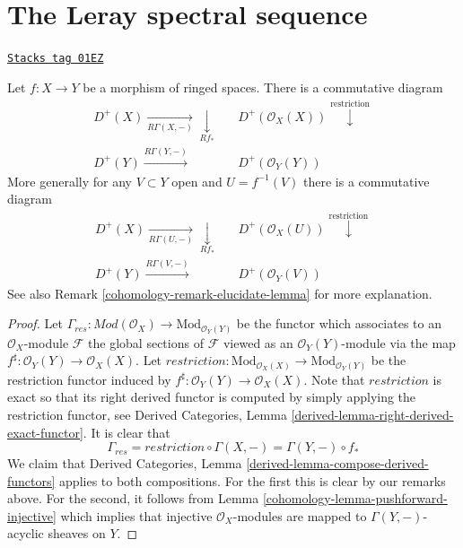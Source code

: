 \section{The Leray spectral sequence}
\label{cohomology-section-Leray}
\begin{lemma}
\label{cohomology-lemma-before-Leray}
\href{https://stacks.math.columbia.edu/tag/01EZ}{\texttt{Stacks tag 01EZ}}

Let $f : X \to Y$ be a morphism of ringed spaces.
There is a commutative diagram
$$
\begin{array}{ccc}D^{+}(X) \underset{R\Gamma(X, -)}{\longrightarrow}\underset{Rf_*}{\downarrow} &  & D^{+}(\mathcal{O}_X(X)) \overset{\text{restriction}}{\downarrow} \\ D^{+}(Y) \overset{R\Gamma(Y, -)}{\longrightarrow} &  & D^{+}(\mathcal{O}_Y(Y))\end{array}
$$
More generally for any $V \subset Y$ open and $U = f^{-1}(V)$ there
is a commutative diagram
$$
\begin{array}{ccc}D^{+}(X) \underset{R\Gamma(U, -)}{\longrightarrow}\underset{Rf_*}{\downarrow} &  & D^{+}(\mathcal{O}_X(U)) \overset{\text{restriction}}{\downarrow} \\ D^{+}(Y) \overset{R\Gamma(V, -)}{\longrightarrow} &  & D^{+}(\mathcal{O}_Y(V))\end{array}
$$
See also Remark \ref{cohomology-remark-elucidate-lemma} for more explanation.
\end{lemma}

\begin{proof}

Let
$\Gamma_{res} : \textit{Mod}(\mathcal{O}_X) \to \text{Mod}_{\mathcal{O}_Y(Y)}$
be the functor which associates to an $\mathcal{O}_X$-module $\mathcal{F}$
the global sections of $\mathcal{F}$ viewed as an $\mathcal{O}_Y(Y)$-module
via the map $f^\sharp : \mathcal{O}_Y(Y) \to \mathcal{O}_X(X)$. Let
$restriction : \text{Mod}_{\mathcal{O}_X(X)} \to \text{Mod}_{\mathcal{O}_Y(Y)}$
be the restriction functor induced by
$f^\sharp : \mathcal{O}_Y(Y) \to \mathcal{O}_X(X)$. Note that $restriction$
is exact so that
its right derived functor is computed by simply applying the restriction
functor, see
Derived Categories, Lemma \ref{derived-lemma-right-derived-exact-functor}.
It is clear that
$$
\Gamma_{res}
=
restriction \circ \Gamma(X, -)
=
\Gamma(Y, -) \circ f_*
$$
We claim that
Derived Categories, Lemma \ref{derived-lemma-compose-derived-functors}
applies to both compositions. For the first this is clear by our remarks
above. For the second, it follows from
Lemma \ref{cohomology-lemma-pushforward-injective} which implies that
injective $\mathcal{O}_X$-modules are mapped to $\Gamma(Y, -)$-acyclic
sheaves on $Y$.
\end{proof}

